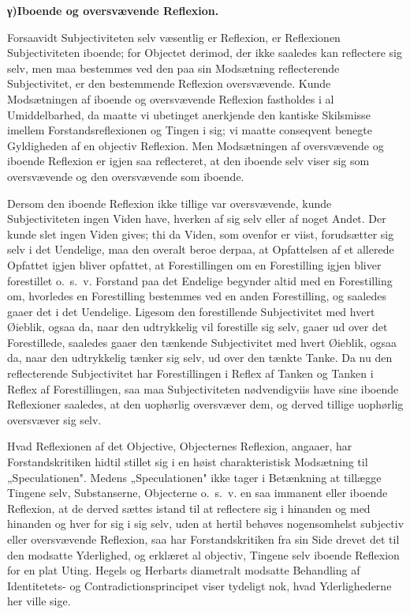 \documentclass[12pt]{book}
\newcommand{\opage}[1]{\marginnote{\footnotesize\textit{[#1]}}}
\begin{document}
\begin{center}{\bfseries γ)\quad Iboende og oversvævende Reflexion.}\end{center}

Forsaavidt Subjectiviteten selv væsentlig er Reflexion, er Reflexionen
Subjectiviteten iboende; for Objectet derimod, der ikke saaledes kan reflectere sig
selv, men maa bestemmes ved den paa sin Modsætning reflecterende Subjectivitet, er
den bestemmende Reflexion oversvævende. Kunde Modsætningen af iboende og
oversvævende Reflexion fastholdes i al Umiddelbarhed, da maatte vi ubetinget
anerkjende den kantiske Skilsmisse imellem Forstandsreflexionen og Tingen i sig; vi
maatte conseqvent benegte Gyldigheden af en objectiv Reflexion. Men Modsætningen af
oversvævende og iboende Reflexion er igjen saa reflecteret, at den iboende selv viser
sig som oversvævende og den oversvævende som iboende.

Dersom den iboende Reflexion ikke tillige var oversvævende, kunde Subjectiviteten
ingen Viden have, hverken af sig selv eller af noget Andet. Der kunde slet ingen
Viden gives; thi da Viden, som ovenfor er viist, forudsætter sig selv i det
Uendelige, maa den overalt beroe derpaa, at Opfattelsen af et allerede Opfattet
\opage{71} igjen bliver opfattet, at Forestillingen om en Forestilling igjen bliver forestillet
o.\ s.\ v. Forstand paa det Endelige begynder altid med en Forestilling om,
hvorledes en Forestilling bestemmes ved en anden Forestilling, og saaledes gaaer det
i det Uendelige. Ligesom den forestillende Subjectivitet med hvert Øieblik, ogsaa
da, naar den udtrykkelig vil forestille sig selv, gaaer ud over det Forestillede,
saaledes gaaer den tænkende Subjectivitet med hvert Øieblik, ogsaa da, naar den
udtrykkelig tænker sig selv, ud over den tænkte Tanke. Da nu den reflecterende
Subjectivitet har Forestillingen i Reflex af Tanken og Tanken i Reflex af
Forestillingen, saa maa Subjectiviteten nødvendigviis have sine iboende Reflexioner
saaledes, at den uophørlig oversvæver dem, og derved tillige uophørlig oversvæver sig
selv.

Hvad Reflexionen af det Objective, Objecternes Reflexion, angaaer, har
Forstandskritiken hidtil stillet sig i en høist charakteristisk Modsætning til
„Speculationen". Medens „Speculationen" ikke tager i Betænkning at tillægge Tingene
selv, Substanserne, Objecterne o.\ s.\ v. en saa immanent eller iboende Reflexion,
at de derved sættes istand til at reflectere sig i hinanden og med hinanden og hver
for sig i sig selv, uden at hertil behøves nogensomhelst subjectiv eller
oversvævende Reflexion, saa har Forstandskritiken fra sin Side drevet det til den
modsatte Yderlighed, og erklæret al objectiv, Tingene selv iboende Reflexion for en
plat Uting. Hegels og Herbarts diametralt modsatte Behandling af Identitetets- og
Contradictionsprincipet viser tydeligt nok, hvad Yderlighederne her ville sige.
\end{document}
